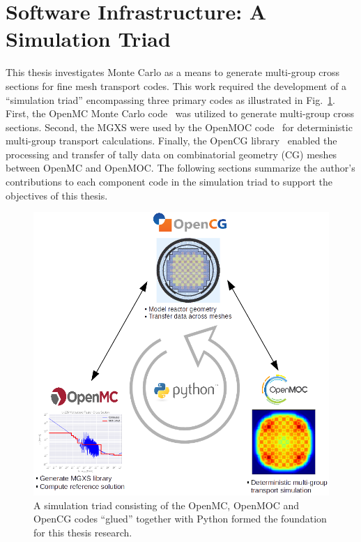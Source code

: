 \documentclass[12pt,twoside]{mitthesis-exec}
\begin{document}
\section*{Software Infrastructure: A Simulation Triad}

This thesis investigates Monte Carlo as a means to generate multi-group cross sections for fine mesh transport codes. This work required the development of a ``simulation triad'' encompassing three primary codes as illustrated in Fig.~\ref{fig:simulation-triad}. First, the OpenMC Monte Carlo code~\cite{romano2013openmc} was utilized to generate multi-group cross sections. Second, the MGXS were used by the OpenMOC code~\cite{boyd2014openmoc} for deterministic multi-group transport calculations. Finally, the OpenCG library~\cite{boyd2015opencg} enabled the processing and transfer of tally data on combinatorial geometry (CG) meshes between OpenMC and OpenMOC. The following sections summarize the author's contributions to each component code in the simulation triad to support the objectives of this thesis.

\begin{figure}[h!]
  \centering
  \includegraphics[width=0.95\linewidth]{figures/workflow/triad/simulation-triad}
\caption[A simulation triad of OpenMC, OpenMOC and OpenCG]{A simulation triad consisting of the OpenMC, OpenMOC and OpenCG codes ``glued'' together with Python formed the foundation for this thesis research.}
\label{fig:simulation-triad}
\end{figure}
\end{document}
